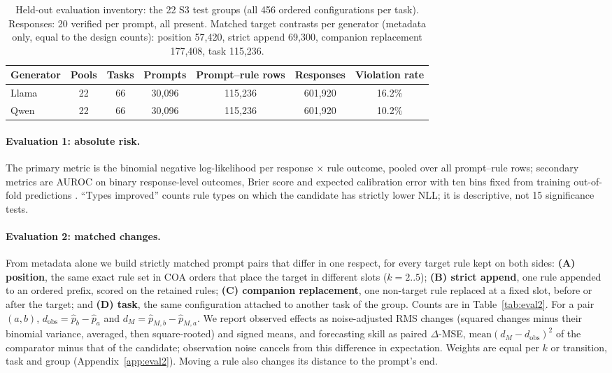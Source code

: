 \documentclass{article}
\newcommand{\phat}{\hat{p}}
\begin{document}
\begin{table}[t]
\centering\footnotesize
\caption{Held-out evaluation inventory: the 22 S3 test groups (all 456 ordered configurations per task). Responses: 20 verified per prompt, all present. Matched target contrasts per generator (metadata only, equal to the design counts): position 57,420, strict append 69,300, companion replacement 177,408, task 115,236.}
\label{tab:inventory}
\begin{tabular}{lcccccc}
\toprule
Generator & Pools & Tasks & Prompts & Prompt--rule rows & Responses & Violation rate \\
\midrule
Llama & 22 & 66 & 30,096 & 115,236 & 601,920 & 16.2\% \\
Qwen & 22 & 66 & 30,096 & 115,236 & 601,920 & 10.2\% \\
\bottomrule
\end{tabular}
\end{table}


\paragraph{Evaluation 1: absolute risk.} The primary metric is the binomial negative log-likelihood per
response $\times$ rule outcome, pooled over all prompt--rule rows; secondary metrics are AUROC on binary
response-level outcomes, Brier score and expected calibration error with ten bins fixed from training out-of-fold
predictions \citep{guo2017calibration}. ``Types improved'' counts rule types on which the candidate has strictly lower
NLL; it is descriptive, not 15 significance tests.

\paragraph{Evaluation 2: matched changes.} From metadata alone we build strictly matched prompt pairs
that differ in one respect, for every target rule kept on both sides: \textbf{(A) position}, the same exact rule set in
COA orders that place the target in different slots ($k=2..5$); \textbf{(B) strict append}, one rule appended
to an ordered prefix, scored on the retained rules; \textbf{(C) companion replacement}, one non-target rule replaced
at a fixed slot, before or after the target; and \textbf{(D) task}, the same configuration attached to another task of
the group. Counts are in Table~\ref{tab:eval2}. For a pair
$(a,b)$, $d_{\text{obs}}=\phat_b-\phat_a$ and $d_M=\hat p_{M,b}-\hat p_{M,a}$. We report observed effects as
noise-adjusted RMS changes (squared changes minus their binomial variance, averaged, then square-rooted) and signed
means, and forecasting skill as paired $\Delta$-MSE, $\text{mean}(d_M-d_{\text{obs}})^2$ of the comparator minus that of
the candidate; observation noise cancels from this difference in expectation. Weights are equal per $k$ or transition,
task and group (Appendix~\ref{app:eval2}). Moving a rule also changes its distance to the prompt's end.
\end{document}
